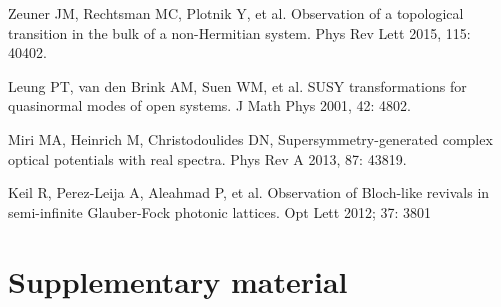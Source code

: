 \documentclass[12pt]{iopart}
\begin{document}
\begin{thebibliography}{100}
	
	  Zeuner JM, Rechtsman MC, Plotnik Y,  et al.
	Observation of a topological transition in the bulk of a non-Hermitian system.
	Phys Rev  Lett 2015,  115: 40402.
	
	 Leung PT, van den Brink AM,  Suen WM, et al.
	SUSY transformations for quasinormal modes of open systems.
	J Math Phys  2001,  42: 4802.
	
	 Miri MA, Heinrich M,   Christodoulides DN,
	Supersymmetry-generated complex optical potentials with real spectra.
	Phys  Rev  A 2013, 87: 43819.
	
	 Keil R, Perez-Leija A, Aleahmad P, et al.
	Observation of Bloch-like revivals in semi-infinite Glauber-Fock photonic lattices.
        Opt  Lett  2012; 37: 3801

	
	
\end{thebibliography}

\section*{Supplementary material}
\end{document}
